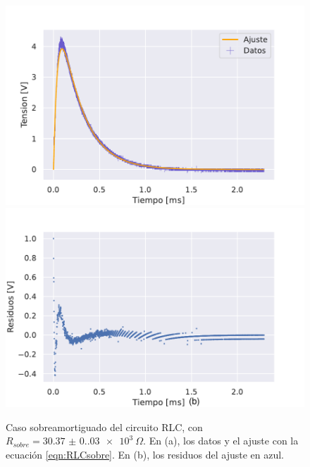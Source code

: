 \begin{figure} [H]
    \centering
    \includegraphics[scale=0.5]{Figuras/RLC/RLC sobreamortiguado 1.pdf}
    \includegraphics[scale=0.5]{Figuras/RLC/residuos sobreamortiguado.pdf}
    \caption{Caso sobreamortiguado del circuito RLC, con $R_{sobre}=\SI{30.37(0.03)e3}{\Omega}$. En (a), los datos y el ajuste con la ecuación \eqref{eqn:RLCsobre}. En (b), los residuos del ajuste en azul.}
    \label{fig:RLC sobreamortiguado}
\end{figure}
